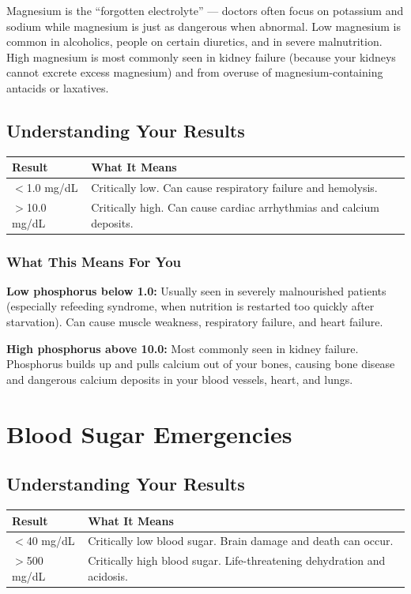 Magnesium is the ``forgotten electrolyte'' --- doctors often focus on potassium and sodium while magnesium is just as dangerous when abnormal. Low magnesium is common in alcoholics, people on certain diuretics, and in severe malnutrition. High magnesium is most commonly seen in kidney failure (because your kidneys cannot excrete excess magnesium) and from overuse of magnesium-containing antacids or laxatives.

\subsection{Understanding Your Results}

\begin{longtable}{@{}ll@{}}
\toprule
\textbf{Result} & \textbf{What It Means} \\
\midrule
$<$1.0 mg/dL & Critically low. Can cause respiratory failure and hemolysis. \\
$>$10.0 mg/dL & Critically high. Can cause cardiac arrhythmias and calcium deposits. \\
\bottomrule
\end{longtable}

\subsubsection{What This Means For You}

\textbf{Low phosphorus below 1.0:} Usually seen in severely malnourished patients (especially refeeding syndrome, when nutrition is restarted too quickly after starvation). Can cause muscle weakness, respiratory failure, and heart failure.

\textbf{High phosphorus above 10.0:} Most commonly seen in kidney failure. Phosphorus builds up and pulls calcium out of your bones, causing bone disease and dangerous calcium deposits in your blood vessels, heart, and lungs.

\clearpage
\section{Blood Sugar Emergencies}

\subsection{Understanding Your Results}

\begin{longtable}{@{}ll@{}}
\toprule
\textbf{Result} & \textbf{What It Means} \\
\midrule
$<$40 mg/dL & Critically low blood sugar. Brain damage and death can occur. \\
$>$500 mg/dL & Critically high blood sugar. Life-threatening dehydration and acidosis. \\
\bottomrule
\end{longtable}

